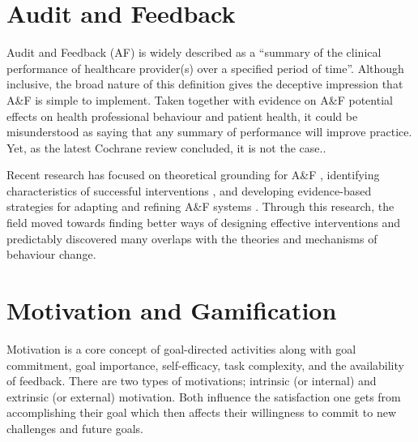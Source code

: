 \section{Audit and Feedback}
Audit and Feedback (\gls{AF}) is widely described as a “summary of the clinical performance of healthcare provider(s) over a specified period of time”\cite{ivers2012audit}. Although inclusive, the broad nature of this definition gives the deceptive impression that A\&F is simple to implement. Taken together with evidence on  A\&F potential effects on health professional behaviour and patient health, it could be misunderstood as saying that any summary of performance will improve practice. Yet, as the latest Cochrane review concluded, it is not the case.\cite{ivers2012audit}.

Recent research has focused on theoretical grounding for A\&F \cite{hysong2017theory}\cite{brown2019clinical}\cite{landis2015computer}, identifying characteristics of successful interventions \cite{ivers2012audit}\cite{colquhoun2013systematic}\cite{tuti2017systematic}, and developing evidence-based strategies for adapting and refining A\&F systems \cite{brehaut2016practice}\cite{mcnamara2016confidential}. Through this research, the field moved towards finding better ways of designing effective interventions and predictably discovered many overlaps with the theories and mechanisms of behaviour change\cite{colquhoun2017advancing}.


\section{Motivation and Gamification}
Motivation is a core concept of goal-directed activities along with goal commitment, goal importance, self-efficacy, task complexity, and the availability of feedback. There are two types of motivations; intrinsic (or internal) and extrinsic (or external) motivation. Both influence the satisfaction one gets from accomplishing their goal which then affects their willingness to commit to new challenges and future goals. \cite{locke2002building}

